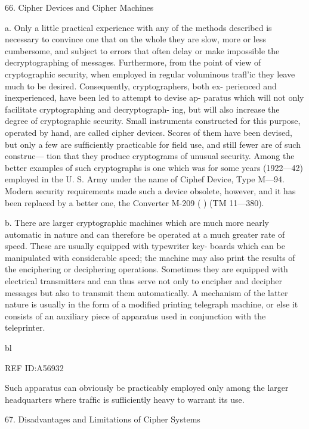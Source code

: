 {{{66. Cipher Devices and Cipher Machines

a. Only a little practical experience with any of the methods described
is necessary to convince one that on the whole they are slow, more or less
cumbersome, and subject to errors that often delay or make impossible
the decryptographing of messages. Furthermore, from the point of view
of cryptographic security, when employed in regular voluminous traﬂ'ic
they leave much to be desired. Consequently, cryptographers, both ex-
perienced and inexperienced, have been led to attempt to devise ap-
paratus which will not only facilitate cryptographing and decryptograph-
ing, but will also increase the degree of cryptographic security. Small
instruments constructed for this purpose, operated by hand, are called
cipher devices. Scores of them have been devised, but only a few are
sufﬁciently practicable for ﬁeld use, and still fewer are of such construc—
tion that they produce cryptograms of unusual security. Among the
better examples of such cryptographs is one which was for some years
(1922—42) employed in the U. S. Army under the name of Ciphef
Device, Type M—94. Modern security requirements made such a device
obsolete, however, and it has been replaced by a better one, the Converter
M-209 ( ) (TM 11—380).

b. There are larger cryptographic machines which are much more
nearly automatic in nature and can therefore be operated at a much
greater rate of speed. These are usually equipped with typewriter key-
boards which can be manipulated with considerable speed; the machine
may also print the results of the enciphering or deciphering operations.
Sometimes they are equipped with electrical transmitters and can thus
serve not only to encipher and decipher messages but also to transmit
them automatically. A mechanism of the latter nature is usually in the
form of a modiﬁed printing telegraph machine, or else it consists of an
auxiliary piece of apparatus used in conjunction with the teleprinter.

bl

 

 

 

 

REF ID:A56932

Such apparatus can obviously be practicably employed only among the
larger headquarters where trafﬁc is suﬂiciently heavy to warrant its use.

67. Disadvantages and Limitations of Cipher Systems

}}}
